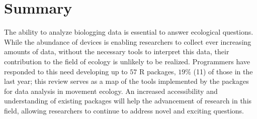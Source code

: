 \documentclass[a4paper,12pt]{article}
\newcommand{\Rpkg}[1]{\texttt{#1}}
\begin{document}
\section*{Summary}

The ability to analyze biologging data is essential to answer ecological questions. While the abundance of devices is enabling researchers to collect ever increasing amounts of data, without the necessary tools to interpret this data, their contribution to the field of ecology is unlikely to be realized. Programmers have responded to this need developing up to $57$ R packages, $19\%$ (11) of those in the last year; this review serves as a map of the tools implemented by the packages for data analysis in movement ecology. An increased accessibility and understanding of existing packages will help the advancement of research in this field, allowing researchers to continue to address novel and exciting questions. 
%
%
\end{document}
